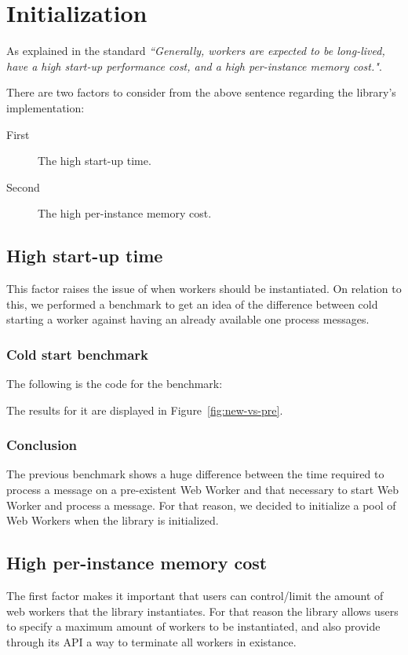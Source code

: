 \section{Initialization}

As explained in the standard \cite{w3c-ww} \textit{``Generally, workers are expected to be long-lived, have a high start-up performance cost, and a high per-instance memory cost."}.

There are two factors to consider from the above sentence regarding the library's implementation:

\begin{description}
\item[First] The high start-up time.
\item[Second] The high per-instance memory cost.
\end{description}

\subsection{High start-up time}
This factor raises the issue of when workers should be instantiated. On relation to this, we performed a benchmark to get an idea of the difference between cold starting a worker against having an already available one process messages.

\subsubsection{Cold start benchmark}
The following is the code for the benchmark:

The results for it are displayed in Figure~\ref{fig:new-vs-pre}.

\subsubsection{Conclusion}
The previous benchmark shows a huge difference between the time required to process a message on a pre-existent Web Worker and that necessary to start Web Worker and process a message. For that reason, we decided to initialize a pool of Web Workers when the library is initialized.

\subsection{High per-instance memory cost}
The first factor makes it important that users can control/limit the amount of web workers that the library instantiates. For that reason the library allows users to specify a maximum amount of workers to be instantiated, and also provide through its API a way to terminate all workers in existance.

